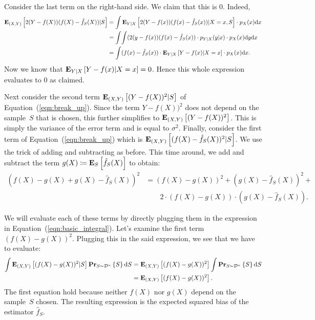 Consider the last term on the right-hand side. We claim that this is $0$. Indeed,
\begin{align*}
    \mathbf{E}_{(X, Y)} \left [ 2 (Y - f(X)) (f(X) - \hat{f}_S(X)) \vert S \right ] & =
    \int \mathbf{E}_{Y \vert X} \left [ 2 (Y - f(x)) (f(x) - \hat{f}_S(x)) \vert X = x, S \right ] \cdot p_X(x) \text{d} x \\
    & = \int \!\int (2 (y - f(x)) (f(x) - \hat{f}_S(x)) \cdot p_{Y \vert X}(y \vert x) \cdot p_X(x) \text{d} y \text{d} x \\
    & = \int (f(x) - \hat{f}_S(x)) \cdot \mathbf{E}_{Y \vert X} \left [ Y - f(x) \vert X = x \right ] \cdot p_X(x) \text{d} x.
\end{align*}
Now we know that $\mathbf{E}_{Y \vert X} \left [ Y - f(x) \vert X = x \right ] = 0$. Hence this 
whole expression evaluates to $0$ as claimed. 

Next consider the second term $\mathbf{E}_{(X, Y)} \left [ (Y - f(X))^2 \vert S \right ]$ of 
Equation~(\ref{eqn:break_up}). Since the term $Y - f(X))^2$ does not depend 
on the sample~$S$ that is chosen, this further simplifies to 
$\mathbf{E}_{(X, Y)} \left [ (Y - f(X))^2 \right ]$. This is simply the variance of the error term 
and is equal to $\sigma^2$. Finally, consider the first term of 
Equation~(\ref{eqn:break_up}) which is $\mathbf{E}_{(X, Y)} \left [ (f(X) - \hat{f}_S(X))^2 \vert S \right ]$. 
We use the trick of adding and subtracting as before. This time around, we add and 
subtract the term $g(X) \coloneqq \mathbf{E}_{S} \left [ \hat{f}_S(X) \right ]$ to obtain:
\begin{equation}
\begin{split}
    (f(X) - g(X) + g(X) - \hat{f}_S(X))^2 & = (f(X) - g(X))^2 + (g(X) - \hat{f}_S(X))^2 + \\
            & \quad \quad 2 \cdot (f(X) - g(X)) \cdot (g(X) - \hat{f}_S(X)). 
\end{split} 
\end{equation}

We will evaluate each of these terms by directly plugging them in the expression
in Equation~(\ref{eqn:basic_integral}). Let's examine the first term $(f(X) - g(X))^2$.
Plugging this in the said expression, we see that we have to evaluate:
\begin{align}
    \int  \mathbf{E}_{(X, Y)} \left [ (f(X) - g(X))^2 \vert S \right ] \mathbf{Pr}_{S \sim \mathcal{D}^n} \left \{ S \right \} \text{d} S
     & =  \mathbf{E}_{(X, Y)} \left [ (f(X) - g(X))^2 \right ] \int    \mathbf{Pr}_{S \sim \mathcal{D}^n} \left \{ S \right \} \text{d} S \nonumber \\
     & =  \mathbf{E}_{(X, Y)} \left [ (f(X) - g(X))^2 \right ].
\end{align}
The first equation hold because neither $f(X)$ nor $g(X)$ depend on the sample~$S$ 
chosen. The resulting expression is the expected squared bias of the estimator 
$\hat{f}_S$.

